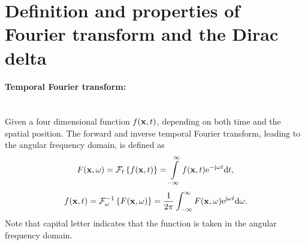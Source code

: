 \section{Definition and properties of Fourier transform and the Dirac delta}
\label{App:Fourier_def}

\paragraph{Temporal Fourier transform:}\mbox{} \\
Given a four dimensional function $f(\mathbf{x},t)$, depending on both time and the spatial position.
The forward and inverse temporal Fourier transform, leading to the angular frequency domain, is defined as 
\begin{equation}
\label{eq:temporal_fourier_transform_def}
F(\mathbf{x},\omega) = \mathcal{F}_t \left\{ f(\mathbf{x},t) \right\} = \int\limits_ {-\infty}^{\infty} f(\mathbf{x},t) \mathrm{e}^{-\mathrm{j} \omega t} \mathrm{d} t,
\end{equation}
\begin{equation}
\label{eq:temporal_inverse_fourier_transform_def}
f(\mathbf{x},t) = \mathcal{F}_{\omega}^{-1} \left\{ F(\mathbf{x},\omega) \right\} = \frac{1}{2\pi} \int_ {-\infty}^{\infty} F(\mathbf{x},\omega) \mathrm{e}^{ \mathrm{j} \omega t} \mathrm{d} \omega.
\end{equation}
Note that capital letter indicates that the function is taken in the angular frequency domain.
%
